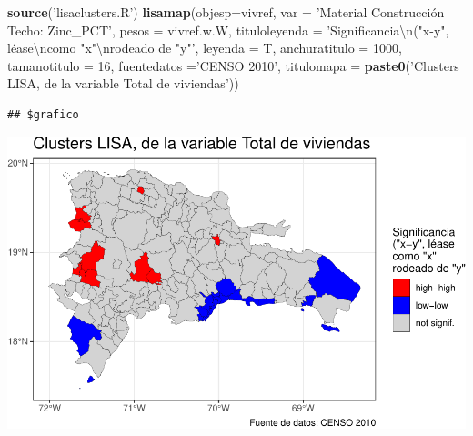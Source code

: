 \documentclass[11pt,]{article}
\newenvironment{Shaded}{\begin{snugshade}}{\end{snugshade}}
\newcommand{\KeywordTok}[1]{\textcolor[rgb]{0.13,0.29,0.53}{\textbf{#1}}}
\newcommand{\DataTypeTok}[1]{\textcolor[rgb]{0.13,0.29,0.53}{#1}}
\newcommand{\DecValTok}[1]{\textcolor[rgb]{0.00,0.00,0.81}{#1}}
\newcommand{\CharTok}[1]{\textcolor[rgb]{0.31,0.60,0.02}{#1}}
\newcommand{\StringTok}[1]{\textcolor[rgb]{0.31,0.60,0.02}{#1}}
\newcommand{\NormalTok}[1]{#1}
\begin{document}
\begin{Shaded}
\begin{Highlighting}[]
\KeywordTok{source}\NormalTok{(}\StringTok{'lisaclusters.R'}\NormalTok{)}
\KeywordTok{lisamap}\NormalTok{(}\DataTypeTok{objesp=}\NormalTok{vivref,}
        \DataTypeTok{var =} \StringTok{'Material Construcción Techo: Zinc_PCT'}\NormalTok{,}
        \DataTypeTok{pesos =}\NormalTok{ vivref.w.W,}
        \DataTypeTok{tituloleyenda =} \StringTok{'Significancia}\CharTok{\textbackslash{}n}\StringTok{("x-y", léase}\CharTok{\textbackslash{}n}\StringTok{como "x"}\CharTok{\textbackslash{}n}\StringTok{rodeado de "y"'}\NormalTok{,}
        \DataTypeTok{leyenda =}\NormalTok{ T,}
        \DataTypeTok{anchuratitulo =} \DecValTok{1000}\NormalTok{,}
        \DataTypeTok{tamanotitulo =} \DecValTok{16}\NormalTok{,}
        \DataTypeTok{fuentedatos =}\StringTok{'CENSO 2010'}\NormalTok{,}
        \DataTypeTok{titulomapa =} \KeywordTok{paste0}\NormalTok{(}\StringTok{'Clusters LISA, de la variable Total de viviendas'}\NormalTok{))}
\end{Highlighting}
\end{Shaded}

\begin{verbatim}
## $grafico
\end{verbatim}

\includegraphics{proyecto_files/figure-latex/unnamed-chunk-2-15.pdf}
\end{document}
